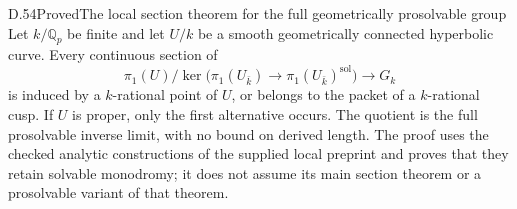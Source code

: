 \begin{statement}{D.54}{Proved}{The local section theorem for the full geometrically prosolvable group}
Let \(k/\mathbb Q_p\) be finite and let \(U/k\) be a smooth
geometrically connected hyperbolic curve.  Every continuous section of
\[
  \pi_1(U)/\ker\bigl(\pi_1(U_{\bar k})\to
              \pi_1(U_{\bar k})^{\mathrm{sol}}\bigr)
                  \longrightarrow G_k
\]
is induced by a \(k\)-rational point of \(U\), or belongs to the
packet of a \(k\)-rational cusp.  If \(U\) is proper, only the first
alternative occurs.  The quotient is the full prosolvable inverse
limit, with no bound on derived length.  The proof uses the checked
analytic constructions of the supplied local preprint and proves
that they retain solvable monodromy; it does not assume its main
section theorem or a prosolvable variant of that theorem.
\end{statement}
